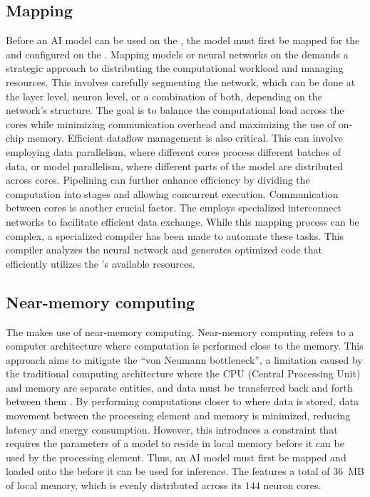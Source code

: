 \subsection{Mapping}
Before an AI model can be used on the \graicore{}, the model must first be mapped for the \graicore{} and configured on the \graicore{}.
Mapping models or neural networks on the \graicore{} demands a strategic approach to distributing the computational workload and managing resources.
This involves carefully segmenting the network, which can be done at the layer level, neuron level, or a combination of both, depending on the network's structure. 
The goal is to balance the computational load across the cores while minimizing communication overhead and maximizing the use of on-chip memory.
Efficient dataflow management is also critical.
This can involve employing data parallelism, where different cores process different batches of data, or model parallelism, where different parts of the model are distributed across cores.
Pipelining can further enhance efficiency by dividing the computation into stages and allowing concurrent execution.
Communication between cores is another crucial factor.
The \graicore{} employs specialized interconnect networks to facilitate efficient data exchange.
While this mapping process can be complex, a specialized compiler has been made to automate these tasks.
This compiler analyzes the neural network and generates optimized code that efficiently utilizes the \graicore{}'s available resources.

\subsection{Near-memory computing}
The \graicore{} makes use of near-memory computing.
Near-memory computing refers to a computer architecture where computation is performed close to the memory.
This approach aims to mitigate the ``von Neumann bottleneck'', a limitation caused by the traditional computing architecture where the CPU (Central Processing Unit) and memory are separate entities, and data must be transferred back and forth between them \cite{indiveriMemoryInformationProcessing2015}.
By performing computations closer to where data is stored, data movement between the processing element and memory is minimized, reducing latency and energy consumption.
However, this introduces a constraint that requires the parameters of a model to reside in local memory before it can be used by the processing element.
Thus, an AI model must first be mapped and loaded onto the \graicore{} before it can be used for inference.
The \graicore{} features a total of \SI{36}{MB} of local memory, which is evenly distributed across its $144$ neuron cores.

